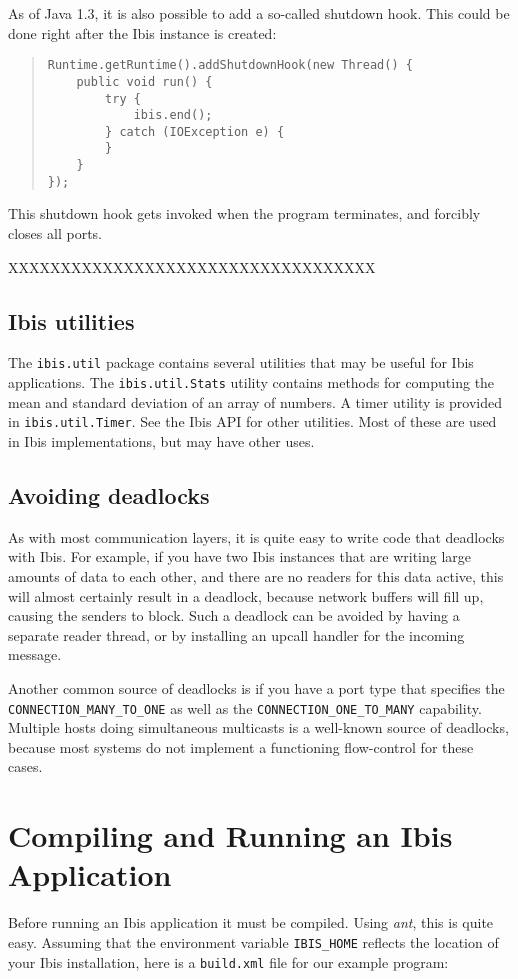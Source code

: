 \documentclass[10pt]{article}
\newcommand{\mysection}[1]{\section{#1}\label{#1}}
\newcommand{\mysubsection}[1]{\subsection{#1}\label{#1}}
\begin{document}
As of Java 1.3, it is also possible to add a so-called shutdown hook.
This could be done right after the Ibis instance is created:
{\small
\begin{quote}
\begin{verbatim}
Runtime.getRuntime().addShutdownHook(new Thread() {
    public void run() {
        try {
            ibis.end();
        } catch (IOException e) {
        }
    }
});
\end{verbatim}
\end{quote}
}
\noindent
This shutdown hook gets invoked when the program terminates, and
forcibly closes all ports.

XXXXXXXXXXXXXXXXXXXXXXXXXXXXXXXXXXX

\mysubsection{Ibis utilities}

The \texttt{ibis.util} package contains several utilities that may be
useful for Ibis applications.
The \texttt{ibis.util.Stats} utility contains methods for computing
the mean and standard deviation of an array of numbers.
A timer utility is provided in \texttt{ibis.util.Timer}.
See the Ibis API for other utilities. Most of these are used in
Ibis implementations, but may have other uses.

\mysubsection{Avoiding deadlocks}

As with most communication layers, it is quite easy to write code that
deadlocks with Ibis. For example, if you have two Ibis instances that
are writing large amounts of data to each other, and there are no
readers for this data active, this will almost certainly result in a deadlock,
because network buffers will fill up, causing the senders to block.
Such a deadlock can be avoided by having a separate reader thread,
or by installing an upcall handler for the incoming message.

Another common source of deadlocks is if you have a port type that
specifies the \texttt{CONNECTION_MANY_TO_ONE} as well as the
\texttt{CONNECTION_ONE_TO_MANY} capability.
Multiple hosts doing simultaneous multicasts
is a well-known source of deadlocks, because most systems do not
implement a functioning flow-control for these cases.

\mysection{Compiling and Running an Ibis Application}

Before running an Ibis application it must be compiled.  Using
\emph{ant}, this is quite easy. Assuming that the environment variable
\texttt{IBIS\_HOME} reflects the location of your Ibis installation,
here is a \texttt{build.xml} file
for our example program:
\end{document}
